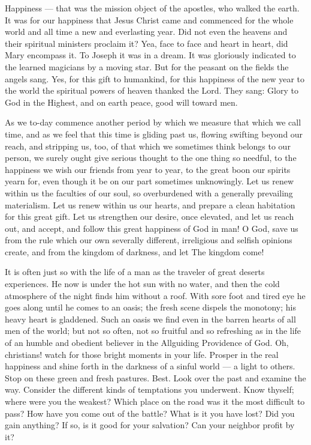 Happiness — that was the mission object of 
the apostles, who walked the earth. It was for 
our happiness that Jesus Christ came and commenced
for the whole world and all time a 
new and everlasting year. Did not even the 
heavens and their spiritual ministers proclaim 
it? Yea, face to face and heart in heart, did 
Mary encompass it. To Joseph it was in a 
dream. It was gloriously indicated to the 
learned magicians by a moving star. But for 
the peasant on the fields the angels sang. Yes, 
for this gift to humankind, for this happiness 
of the new year to the world the spiritual 
powers of heaven thanked the Lord. They 
sang: Glory to God in the Highest, and on 
earth peace, good will toward men. 

As we to-day commence another period by 
which we measure that which we call time, and 
as we feel that this time is gliding past us, 
flowing swifting beyond our reach, and stripping
us, too, of that which we sometimes think
belongs to our person, we surely ought give 
serious thought to the one thing so needful, to 
the happiness we wish our friends from year to 
year, to the great boon our spirits yearn for, 
even though it be on our part sometimes unknowingly.
Let us renew within us the 
faculties of our soul, so overburdened with a 
generally prevailing materialism. Let us renew
within us our hearts, and prepare a clean 
habitation for this great gift. Let us strengthen 
our desire, once elevated, and let us reach out, 
and accept, and follow this great happiness of 
God in man! O God, save us from the rule 
which our own severally different, irreligious 
and selfish opinions create, and from the kingdom
of darkness, and let The kingdom come! 

It is often just so with the life of a man as 
the traveler of great deserts experiences. He
now is under the hot sun with no water, and 
then the cold atmosphere of the night finds him 
without a roof. With sore foot and tired eye 
he goes along until he comes to an oasis; the 
fresh scene dispels the monotony; his heavy 
heart is gladdened. Such an oasis we find even 
in the barren hearts of all men of the world; 
but not so often, not so fruitful and so refreshing
as in the life of an humble and obedient
believer in the Allguiding Providence of God. 
Oh, christians! watch for those bright moments 
in your life. Prosper in the real happiness 
and shine forth in the darkness of a sinful 
world — a light to others. Stop on these green 
and fresh pastures. Best. Look over the past 
and examine the way. Consider the different 
kinds of temptations you underwent. Know 
thyself; where were you the weakest? Which 
place on the road was it the most difficult to 
pass? How have you come out of the battle? 
What is it you have lost? Did you gain anything?
If so, is it good for your salvation? 
Can your neighbor profit by it? 

